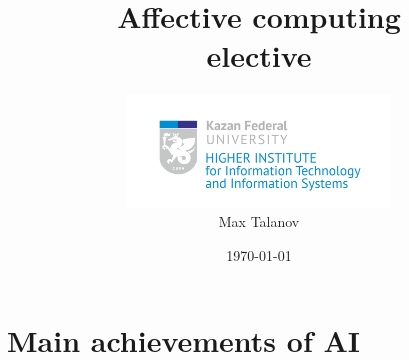 \documentclass[12pt, aspectratio=169]{beamer}
\title[AC intro]{Affective computing \\elective} %
\author[Max Talanov]{
  \includegraphics[height=3cm]{ITIS_logo_bright}\\
  Max Talanov
}
\institute[ITIS: KFU] %
{
Machine cognition lab, Intellectual robotics department, ITIS \\ %
\medskip
\textit{max.talanov@gmail.com} %
}
\date{\today} %
\begin{document}
\begin{frame}
\titlepage %
\end{frame}



\section{Main achievements of AI} %
\end{document}
